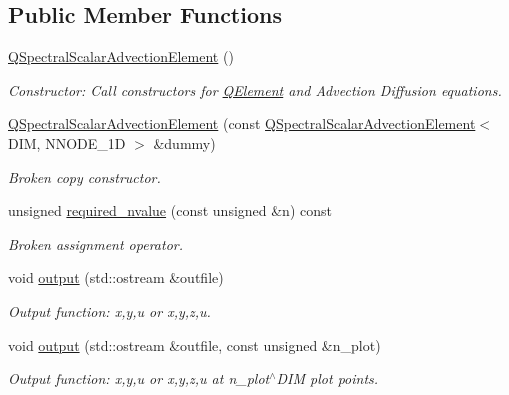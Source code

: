 \subsection*{Public Member Functions}
\begin{DoxyCompactItemize}
\item 
\hyperlink{classoomph_1_1QSpectralScalarAdvectionElement_a63905ff4a980686e18711cc04498df94}{Q\+Spectral\+Scalar\+Advection\+Element} ()
\begin{DoxyCompactList}\small\item\em Constructor\+: Call constructors for \hyperlink{classoomph_1_1QElement}{Q\+Element} and Advection Diffusion equations. \end{DoxyCompactList}\item 
\hyperlink{classoomph_1_1QSpectralScalarAdvectionElement_a71dbb999674e05e7e45a0ccb95bdfea7}{Q\+Spectral\+Scalar\+Advection\+Element} (const \hyperlink{classoomph_1_1QSpectralScalarAdvectionElement}{Q\+Spectral\+Scalar\+Advection\+Element}$<$ D\+IM, N\+N\+O\+D\+E\+\_\+1D $>$ \&dummy)
\begin{DoxyCompactList}\small\item\em Broken copy constructor. \end{DoxyCompactList}\item 
unsigned \hyperlink{classoomph_1_1QSpectralScalarAdvectionElement_a7467b1b382307bb0d40901519465b4b1}{required\+\_\+nvalue} (const unsigned \&n) const
\begin{DoxyCompactList}\small\item\em Broken assignment operator. \end{DoxyCompactList}\item 
void \hyperlink{classoomph_1_1QSpectralScalarAdvectionElement_ad594e0a382ee5e10e50cedf75215f40e}{output} (std\+::ostream \&outfile)
\begin{DoxyCompactList}\small\item\em Output function\+: x,y,u or x,y,z,u. \end{DoxyCompactList}\item 
void \hyperlink{classoomph_1_1QSpectralScalarAdvectionElement_a5d4b75608288e93077aa3132e56a113b}{output} (std\+::ostream \&outfile, const unsigned \&n\+\_\+plot)
\begin{DoxyCompactList}\small\item\em Output function\+: x,y,u or x,y,z,u at n\+\_\+plot$^\wedge$\+D\+IM plot points. \end{DoxyCompactList}\end{DoxyCompactItemize}
